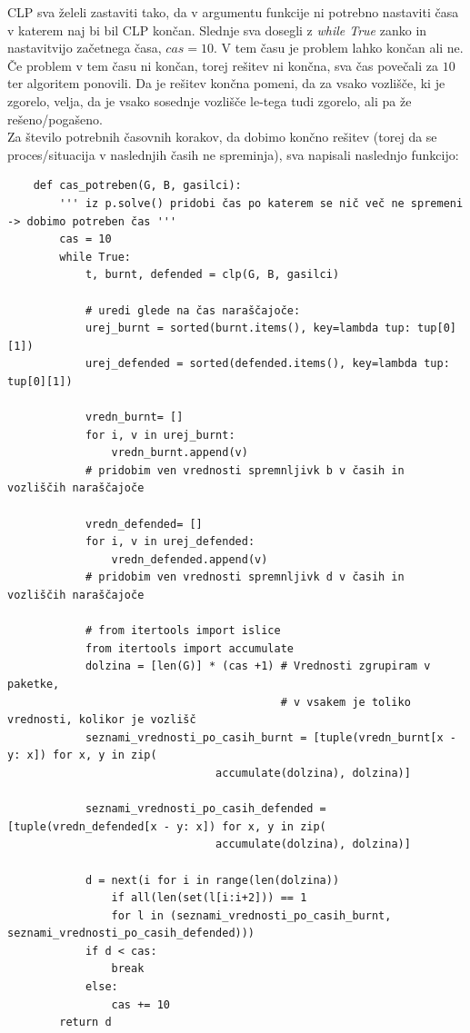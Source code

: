\documentclass[a4paper, 12pt]{article}
\begin{document}
\noindent CLP sva želeli zastaviti tako, da v argumentu funkcije ni potrebno nastaviti časa v
katerem naj bi bil CLP končan. Slednje sva dosegli z \emph{while True} zanko in
nastavitvijo začetnega časa, $cas = 10$. V tem času je problem lahko
končan ali ne. Če problem v tem času ni končan, torej rešitev ni končna, sva čas povečali za $10$ ter
algoritem ponovili.
Da je rešitev končna pomeni, da za vsako vozlišče, ki je zgorelo, velja, da je vsako sosednje
vozlišče le-tega tudi zgorelo, ali pa že rešeno/pogašeno. \\

\noindent Za število potrebnih časovnih korakov, da dobimo končno rešitev (torej da se proces/situacija 
v naslednjih časih ne spreminja),
sva napisali naslednjo funkcijo:

\begin{scriptsize}
\begin{verbatim}
    def cas_potreben(G, B, gasilci):
        ''' iz p.solve() pridobi čas po katerem se nič več ne spremeni -> dobimo potreben čas '''
        cas = 10
        while True:
            t, burnt, defended = clp(G, B, gasilci)

            # uredi glede na čas naraščajoče:
            urej_burnt = sorted(burnt.items(), key=lambda tup: tup[0][1])
            urej_defended = sorted(defended.items(), key=lambda tup: tup[0][1]) 

            vredn_burnt= []
            for i, v in urej_burnt:
                vredn_burnt.append(v)
            # pridobim ven vrednosti spremnljivk b v časih in vozliščih naraščajoče

            vredn_defended= []
            for i, v in urej_defended:
                vredn_defended.append(v)
            # pridobim ven vrednosti spremnljivk d v časih in vozliščih naraščajoče

            # from itertools import islice
            from itertools import accumulate
            dolzina = [len(G)] * (cas +1) # Vrednosti zgrupiram v paketke, 
                                          # v vsakem je toliko vrednosti, kolikor je vozlišč
            seznami_vrednosti_po_casih_burnt = [tuple(vredn_burnt[x - y: x]) for x, y in zip(
                                accumulate(dolzina), dolzina)]

            seznami_vrednosti_po_casih_defended = [tuple(vredn_defended[x - y: x]) for x, y in zip(
                                accumulate(dolzina), dolzina)]

            d = next(i for i in range(len(dolzina)) 
                if all(len(set(l[i:i+2])) == 1 
                for l in (seznami_vrednosti_po_casih_burnt, seznami_vrednosti_po_casih_defended)))
            if d < cas:
                break
            else:
                cas += 10
        return d\end{verbatim}
\end{scriptsize}
\end{document}
